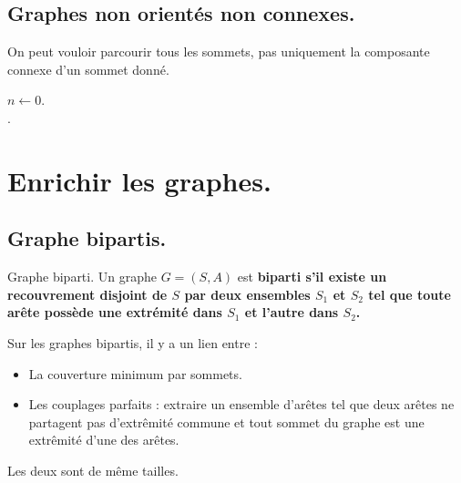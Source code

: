 \documentclass[french, 11pt]{article}
\begin{document}
\subsection{Graphes non orientés non connexes.}

\begin{defi}{}{}
    On peut vouloir parcourir tous les sommets, pas uniquement la composante connexe d'un sommet donné.\n
    \begin{algorithm}[H]
        \LinesNumbered
        \caption{Générique de parcours de graphe.}
        $n\gets0$.\\
        .
    \end{algorithm}
\end{defi}

\section{Enrichir les graphes.}

\subsection{Graphe bipartis.}

\begin{defi}{Graphe biparti.}{}
    Un graphe $G=(S,A)$ est \bf{biparti} s'il existe un recouvrement disjoint de $S$ par deux ensembles $S_1$ et $S_2$ tel que toute arête possède une extrémité dans $S_1$ et l'autre dans $S_2$.
\end{defi}

\begin{prop}{}{}
    Sur les graphes bipartis, il y a un lien entre :
    \begin{itemize}[topsep=0pt,itemsep=-0.9 ex]
        \item La couverture minimum par sommets.
        \item Les couplages parfaits : extraire un ensemble d'arêtes tel que deux arêtes ne partagent pas d'extrêmité commune et tout sommet du graphe est une extrêmité d'une des arêtes.
    \end{itemize}
    Les deux sont de même tailles.
\end{prop}
\end{document}
